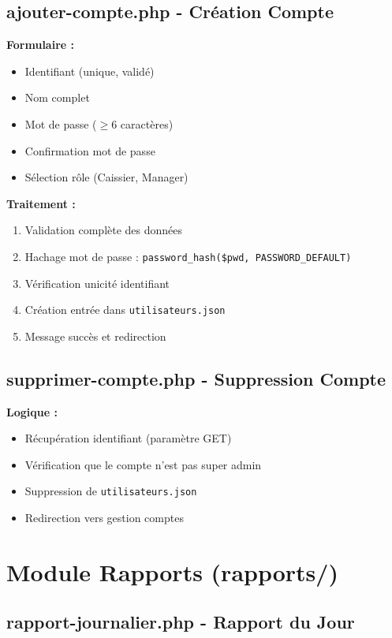 \documentclass[12pt,a4paper]{report}
\begin{document}
\subsection{ajouter-compte.php - Création Compte}

\textbf{Formulaire :}
\begin{itemize}
    \item Identifiant (unique, validé)
    \item Nom complet
    \item Mot de passe ($\geq 6$ caractères)
    \item Confirmation mot de passe
    \item Sélection rôle (Caissier, Manager)
\end{itemize}

\textbf{Traitement :}
\begin{enumerate}
    \item Validation complète des données
    \item Hachage mot de passe : \texttt{password\_hash(\$pwd, PASSWORD\_DEFAULT)}
    \item Vérification unicité identifiant
    \item Création entrée dans \texttt{utilisateurs.json}
    \item Message succès et redirection
\end{enumerate}

\subsection{supprimer-compte.php - Suppression Compte}

\textbf{Logique :}
\begin{itemize}
    \item Récupération identifiant (paramètre GET)
    \item Vérification que le compte n'est pas super admin
    \item Suppression de \texttt{utilisateurs.json}
    \item Redirection vers gestion comptes
\end{itemize}

\section{Module Rapports (rapports/)}

\subsection{rapport-journalier.php - Rapport du Jour}
\end{document}
